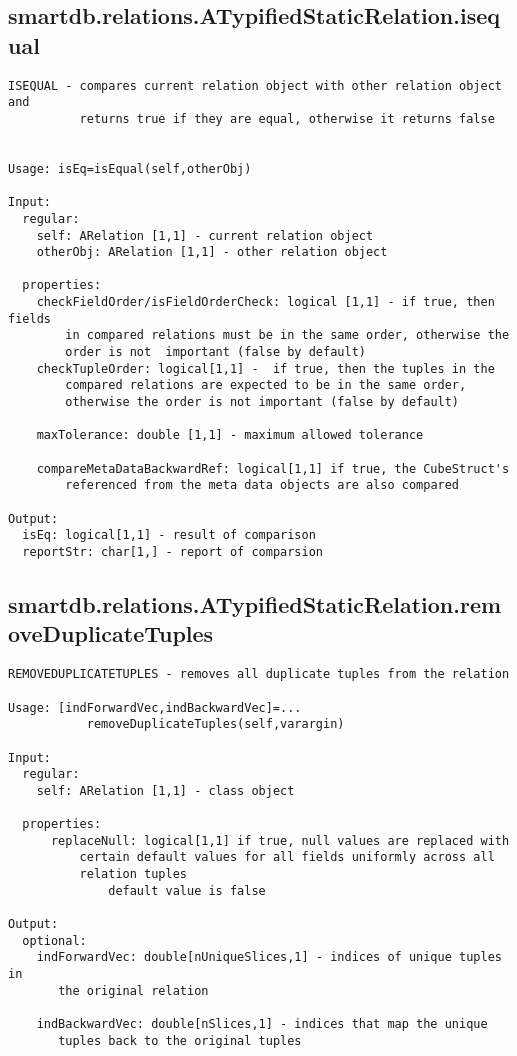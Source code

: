\subsection{\texorpdfstring{smartdb.relations.ATypifiedStaticRelation.isequal}{isequal}}\label{method:smartdb.relations.ATypifiedStaticRelation.isequal}
\begin{verbatim}
ISEQUAL - compares current relation object with other relation object and
          returns true if they are equal, otherwise it returns false


Usage: isEq=isEqual(self,otherObj)

Input:
  regular:
    self: ARelation [1,1] - current relation object
    otherObj: ARelation [1,1] - other relation object

  properties:
    checkFieldOrder/isFieldOrderCheck: logical [1,1] - if true, then fields
        in compared relations must be in the same order, otherwise the
        order is not  important (false by default)
    checkTupleOrder: logical[1,1] -  if true, then the tuples in the
        compared relations are expected to be in the same order,
        otherwise the order is not important (false by default)

    maxTolerance: double [1,1] - maximum allowed tolerance

    compareMetaDataBackwardRef: logical[1,1] if true, the CubeStruct's
        referenced from the meta data objects are also compared

Output:
  isEq: logical[1,1] - result of comparison
  reportStr: char[1,] - report of comparsion
\end{verbatim}
\subsection{\texorpdfstring{smartdb.relations.ATypifiedStaticRelation.removeDuplicateTuples}{removeDuplicateTuples}}\label{method:smartdb.relations.ATypifiedStaticRelation.removeDuplicateTuples}
\begin{verbatim}
REMOVEDUPLICATETUPLES - removes all duplicate tuples from the relation

Usage: [indForwardVec,indBackwardVec]=...
           removeDuplicateTuples(self,varargin)

Input:
  regular:
    self: ARelation [1,1] - class object

  properties:
      replaceNull: logical[1,1] if true, null values are replaced with
          certain default values for all fields uniformly across all
          relation tuples
              default value is false

Output:
  optional:
    indForwardVec: double[nUniqueSlices,1] - indices of unique tuples in
       the original relation

    indBackwardVec: double[nSlices,1] - indices that map the unique
       tuples back to the original tuples
\end{verbatim}
